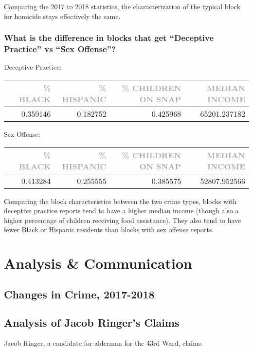 \documentclass[11pt]{article}
\newcommand{\printsubsection}[1]{\normalfont\headerfontlt\textcolor{darkgray}{{#1}}}
\newcommand{\opns}[1]{\textrm{\small\printsubsection{\MakeUppercase{#1}}}}
\begin{document}
Comparing the 2017 to 2018 statistics, the characterization of the typical block for homicide stays effectively the same.

\subsubsection{What is the difference in blocks that get “Deceptive Practice” vs “Sex Offense”?}
Deceptive Practice:
\begin{table}[H]
\centering\renewcommand{\arraystretch}{1.2}
\begin{tabular}{lrrrr}
   &     \opns{\% BLACK} &  \opns{\% HISPANIC} &  \opns{\% CHILDREN ON SNAP} &  \opns{MEDIAN INCOME} \\\hline
   &      0.359146 &      0.182752 &        0.425968 &   65201.237182 \\
\end{tabular}
\end{table}

Sex Offense:
\begin{table}[H]
\centering\renewcommand{\arraystretch}{1.2}
\begin{tabular}{lrrrr}
   &    \opns{\% BLACK} &  \opns{\% HISPANIC} &  \opns{\% CHILDREN ON SNAP} &  \opns{MEDIAN INCOME} \\\hline
   &     0.413284 &      0.255555 &        0.385575 &   52807.952566 \\
\end{tabular}
\end{table}
Comparing the block characteristics between the two crime types, blocks with deceptive practice reports tend to have a higher median income (though also a higher percentage of children receiving food assistance). They also tend to have fewer Black or Hispanic residents than blocks with sex offense reports.

\section{Analysis \& Communication}
\subsection{Changes in Crime, 2017-2018}

\subsection{Analysis of Jacob Ringer's Claims}
Jacob Ringer, a candidate for alderman for the 43rd Ward, claims: 
\end{document}
